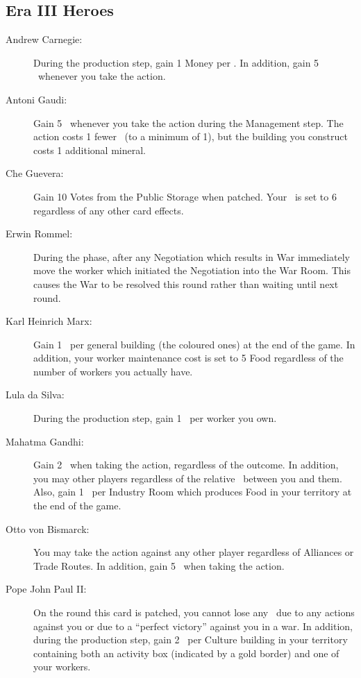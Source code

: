\documentclass[10pt,twocolumn]{article}
\begin{document}
\begin{appendices}
\subsection{Era III Heroes}
\begin{description}
\item[Andrew Carnegie:] During the production step, gain 1 Money per \tra. In addition, gain 5 \vps\ whenever you take the  action.
\item[Antoni Gaudi:] Gain 5 \vps\ whenever you take the  action during the Management step. The  action costs 1 fewer \polf\ (to a minimum of 1), but the building you construct costs 1 additional mineral.
\item[Che Guevera:] Gain 10 Votes from the Public Storage when patched. Your \pol\ is set to 6 regardless of any other card effects.
\item[Erwin Rommel:] During the  phase, after any Negotiation which results in War immediately move the worker which initiated the Negotiation into the War Room. This causes the War to be resolved this round rather than waiting until next round.
\item[Karl Heinrich Marx:] Gain 1 \vp\ per general building (the coloured ones) at the end of the game. In addition, your worker maintenance cost is set to 5 Food regardless of the number of workers you actually have.
\item[Lula da Silva:]During the production step, gain 1 \vp\ per worker you own.
\item[Mahatma Gandhi:] Gain 2 \vps\ when taking the  action, regardless of the outcome. In addition, you may  other players regardless of the relative \mil\ between you and them. Also, gain 1 \vp\ per Industry Room which produces Food in your territory at the end of the game.
\item[Otto von Bismarck:] You may take the  action against any other player regardless of Alliances or Trade Routes. In addition, gain 5 \vps\ when taking the  action.
\item[Pope John Paul II:] On the round this card is patched, you cannot lose any \vps\ due to any  actions against you or due to a ``perfect victory'' against you in a war. In addition, during the production step, gain 2 \vps\ per Culture building in your territory containing both an activity box (indicated by a gold border) and one of your workers.
\end{description}


\end{appendices}
\end{document}
